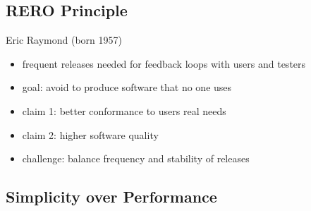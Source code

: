 \subsection{RERO Principle}
\begin{frame}{\insertsubsection}
	\begin{fancycolumns}
		\vspace{-7mm}
		
		\begin{note}{Eric Raymond (born 1957)}
		\end{note}
		\nextcolumn
		\begin{definition}{\insertsubsection}
			\begin{itemize}
				\item frequent releases needed for feedback loops with users and testers
				\item goal: avoid to produce software that no one uses
				\item claim 1: better conformance to users real needs
				\item claim 2: higher software quality
				\item challenge: balance frequency and stability of releases
			\end{itemize}
		\end{definition}
	\end{fancycolumns}
\end{frame}



\subsection{Simplicity over Performance}
\begin{frame}{\insertsubsection}
	\slideSimplicityOverPerformance
\end{frame}

